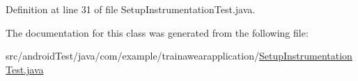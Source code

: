 Definition at line 31 of file Setup\+Instrumentation\+Test.\+java.



The documentation for this class was generated from the following file\+:\begin{DoxyCompactItemize}
\item 
src/android\+Test/java/com/example/trainawearapplication/\mbox{\hyperlink{_setup_instrumentation_test_8java}{Setup\+Instrumentation\+Test.\+java}}\end{DoxyCompactItemize}
